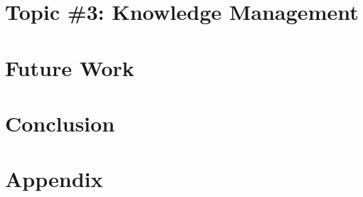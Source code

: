 \documentclass[12pt,oneside]{book}
\begin{document}
\chapter{Topic \#3: Knowledge Management}


\chapter{Future Work}


\chapter{Conclusion}


\printbibliography[heading=bibintoc]


\backmatter

\appendix
\chapter{Appendix}

\end{document}
